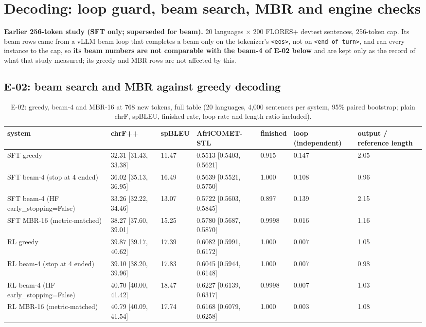 \section{Decoding: loop guard, beam search, MBR and engine checks}\label{app:decoding}

\textbf{Earlier 256-token study (SFT only; superseded for beam).} 20 languages $\times$ 200 FLORES+ devtest sentences, 256-token cap. Its beam rows came from a vLLM beam loop that completes a beam only on the tokenizer's \texttt{<eos>}, not on \texttt{<end\_\allowbreak{}of\_\allowbreak{}turn>}, and ran every instance to the cap, so \textbf{its beam numbers are not comparable with the beam-4 of E-02 below} and are kept only as the record of what that study measured; its greedy and MBR rows are not affected by this. 

\subsection*{E-02: beam search and MBR against greedy decoding}

\begin{table}[t]
\centering\scriptsize
\setlength{\tabcolsep}{4pt}
\caption{E-02: greedy, beam-4 and MBR-16 at 768 new tokens, full table (20 languages, 4,000 sentences per system, 95\% paired bootstrap; plain chrF, spBLEU, finished rate, loop rate and length ratio included).}\label{tab:e02_full}
\begin{tabularx}{\linewidth}{@{}>{\raggedright\arraybackslash}Xllllll@{}}
\toprule
system & chrF++ & spBLEU & AfriCOMET-STL & finished & loop (independent) & output / reference length \\
\midrule
SFT greedy & 32.31 [31.43, 33.38] & 11.47 & 0.5513 [0.5403, 0.5621] & 0.915 & 0.147 & 2.05 \\
SFT beam-4 (stop at 4 ended) & 36.02 [35.13, 36.95] & 16.49 & 0.5639 [0.5521, 0.5750] & 1.000 & 0.108 & 0.96 \\
SFT beam-4 (HF early\_stopping=False) & 33.26 [32.22, 34.46] & 13.07 & 0.5722 [0.5603, 0.5845] & 0.897 & 0.139 & 2.15 \\
SFT MBR-16 (metric-matched) & 38.27 [37.60, 39.01] & 15.25 & 0.5780 [0.5687, 0.5870] & 0.9998 & 0.016 & 1.16 \\
RL greedy & 39.87 [39.17, 40.62] & 17.39 & 0.6082 [0.5991, 0.6172] & 1.000 & 0.007 & 1.05 \\
RL beam-4 (stop at 4 ended) & 39.10 [38.20, 39.96] & 17.83 & 0.6045 [0.5944, 0.6148] & 1.000 & 0.007 & 0.98 \\
RL beam-4 (HF early\_stopping=False) & 40.70 [40.00, 41.42] & 18.47 & 0.6227 [0.6139, 0.6317] & 0.9998 & 0.007 & 1.03 \\
RL MBR-16 (metric-matched) & 40.79 [40.09, 41.54] & 17.74 & 0.6168 [0.6079, 0.6258] & 1.000 & 0.003 & 1.08 \\
\bottomrule
\end{tabularx}
\end{table}

